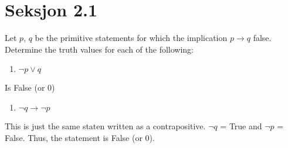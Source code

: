 
\section*{Seksjon 2.1}

\begin{problem}[3] Let $p$, $q$ be the primitive statements for which the
  implication $p \to q$ false. Determine the truth values for each of the following:
  \begin{enumerate}
      The implication $p \to q$ is only false when $p$ is True and $q$ is
      False. Thus
  \addtocounter{enumii}{1}
    \item $\neg p \vee q$
  \end{enumerate}
  Is False (or $0$)
  \begin{enumerate}[resume]
  \addtocounter{enumii}{1}
    \item $\neg q \to \neg p$
  \end{enumerate}
  This is just the same staten written as a contrapositive. $\neg q$ = True and
  $\neg p$ = False. Thus, the statement is False (or $0$).
\end{problem}
%
